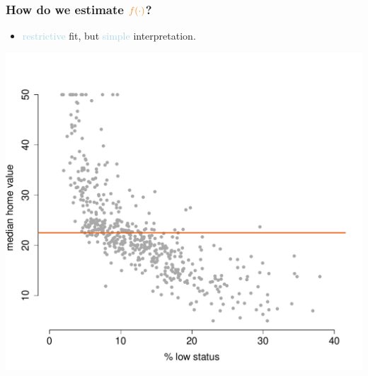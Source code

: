 \documentclass{beamer}
\newcommand{\bo}[1]{\textcolor{burntorange}{#1}}
\newcommand{\lb}[1]{\textcolor{lightblue}{#1}}
\begin{document}
\begin{frame}[plain]
\frametitle{How do we estimate $\bo{f(\cdot)}$?}
\vspace{5mm}
\begin{itemize}
\item[] \bo{\lb{restrictive} fit, but \lb{simple} interpretation}.
\end{itemize}
\vspace{-9mm}
\begin{center}
\includegraphics[scale=.39]{DaveBostonplot1.pdf}
\end{center}


\end{frame}
\end{document}
